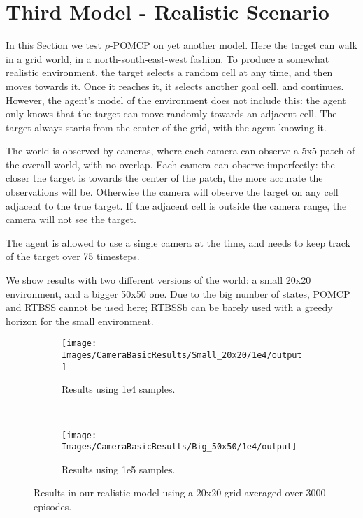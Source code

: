 
\section{Third Model - Realistic Scenario}
In this Section we test $\rho$-POMCP on yet another model. Here the target can walk in a grid world,
in a north-south-east-west fashion. To produce a somewhat realistic environment, the target selects
a random cell at any time, and then moves towards it. Once it reaches it, it selects another goal
cell, and continues. However, the agent's model of the environment does not include this: the agent
only knows that the target can move randomly towards an adjacent cell. The target always starts from
the center of the grid, with the agent knowing it.

The world is observed by cameras, where each camera can observe a 5x5 patch of the overall world,
with no overlap. Each camera can observe imperfectly: the closer the target is towards the center
of the patch, the more accurate the observations will be. Otherwise the camera will observe the
target on any cell adjacent to the true target. If the adjacent cell is outside the camera range,
the camera will not see the target.

The agent is allowed to use a single camera at the time, and needs to keep track of the target over
75 timesteps.

We show results with two different versions of the world: a small 20x20 environment, and a bigger
50x50 one. Due to the big number of states, POMCP and RTBSS cannot be used here; RTBSSb can be
barely used with a greedy horizon for the small environment.

\begin{figure}[ht!]
        \centering
        \begin{subfigure}[t]{0.45\textwidth}
                \texttt{[image: Images/CameraBasicResults/Small\_20x20/1e4/output]}
                \caption{Results using 1e4 samples.}
                \label{fig:cws4mb}
        \end{subfigure}%
        ~ %
        \begin{subfigure}[t]{0.45\textwidth}
                \texttt{[image: Images/CameraBasicResults/Big\_50x50/1e4/output]}
                \caption{Results using 1e5 samples.}
                \label{fig:cws5mb}
        \end{subfigure}
        \caption{Results in our realistic model using a 20x20 grid averaged over 3000 episodes.}\label{fig:cwsmb}
\end{figure}

